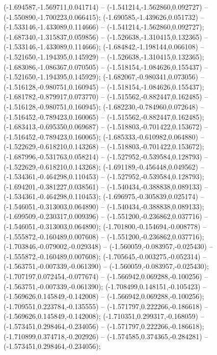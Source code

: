  (-1.694587,-1.569711,0.041714) -- (-1.541214,-1.562860,0.092727) -- (-1.550890,-1.700223,0.066415);
 (-1.690585,-1.439626,0.051732) -- (-1.533146,-1.433089,0.114666) -- (-1.541214,-1.562860,0.092727);
 (-1.687340,-1.315837,0.059856) -- (-1.526638,-1.310415,0.132365) -- (-1.533146,-1.433089,0.114666);
 (-1.684842,-1.198144,0.066108) -- (-1.521650,-1.194395,0.145929) -- (-1.526638,-1.310415,0.132365);
 (-1.683086,-1.086367,0.070505) -- (-1.518154,-1.084626,0.155437) -- (-1.521650,-1.194395,0.145929);
 (-1.682067,-0.980341,0.073056) -- (-1.516128,-0.980751,0.160945) -- (-1.518154,-1.084626,0.155437);
 (-1.681782,-0.879917,0.073770) -- (-1.515562,-0.882447,0.162485) -- (-1.516128,-0.980751,0.160945);
 (-1.682230,-0.784960,0.072648) -- (-1.516452,-0.789423,0.160065) -- (-1.515562,-0.882447,0.162485);
 (-1.683413,-0.695350,0.069687) -- (-1.518803,-0.701422,0.153672) -- (-1.516452,-0.789423,0.160065);
 (-1.685333,-0.610982,0.064880) -- (-1.522629,-0.618210,0.143268) -- (-1.518803,-0.701422,0.153672);
 (-1.687996,-0.531763,0.058214) -- (-1.527952,-0.539584,0.128793) -- (-1.522629,-0.618210,0.143268);
 (-1.691189,-0.456448,0.049562) -- (-1.534361,-0.464298,0.110453) -- (-1.527952,-0.539584,0.128793);
 (-1.694201,-0.381227,0.038561) -- (-1.540434,-0.388838,0.089133) -- (-1.534361,-0.464298,0.110453);
 (-1.696975,-0.305839,0.025174) -- (-1.546051,-0.313003,0.064890) -- (-1.540434,-0.388838,0.089133);
 (-1.699509,-0.230317,0.009396) -- (-1.551200,-0.236862,0.037716) -- (-1.546051,-0.313003,0.064890);
 (-1.701800,-0.154694,-0.008778) -- (-1.555872,-0.160489,0.007608) -- (-1.551200,-0.236862,0.037716);
 (-1.703846,-0.079002,-0.029348) -- (-1.560059,-0.083957,-0.025430) -- (-1.555872,-0.160489,0.007608);
 (-1.705645,-0.003275,-0.052314) -- (-1.563751,-0.007339,-0.061390) -- (-1.560059,-0.083957,-0.025430);
 (-1.707197,0.072454,-0.077674) -- (-1.566942,0.069288,-0.100256) -- (-1.563751,-0.007339,-0.061390);
 (-1.708499,0.148151,-0.105423) -- (-1.569626,0.145849,-0.142008) -- (-1.566942,0.069288,-0.100256);
 (-1.709551,0.223784,-0.135555) -- (-1.571797,0.222266,-0.186618) -- (-1.569626,0.145849,-0.142008);
 (-1.710351,0.299317,-0.168059) -- (-1.573451,0.298464,-0.234056) -- (-1.571797,0.222266,-0.186618);
 (-1.710899,0.374718,-0.202926) -- (-1.574585,0.374365,-0.284281) -- (-1.573451,0.298464,-0.234056);
